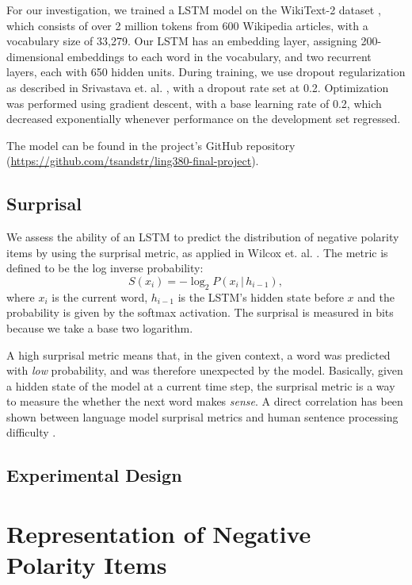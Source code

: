 \documentclass[11pt, round]{article}
\begin{document}
For our investigation, we trained a LSTM model on the WikiText-2 dataset \cite{merity2016pointer}, which consists of over 2 million tokens from 600 Wikipedia articles, with a vocabulary size of 33,279. Our LSTM has an embedding layer, assigning 200-dimensional embeddings to each word in the vocabulary, and two recurrent layers, each with 650 hidden units. During training, we use dropout regularization as described in Srivastava et. al. , with a dropout rate set at 0.2. Optimization was performed using gradient descent, with a base learning rate of 0.2, which decreased exponentially whenever performance on the development set regressed.

The model can be found in the project's GitHub repository (\url{https://github.com/tsandstr/ling380-final-project}).

\subsection{Surprisal}

We assess the ability of an LSTM to predict the distribution of negative polarity items by using the surprisal metric, as applied in Wilcox et. al. . The metric is defined to be the log inverse probability:
\[ S(x_i) = -\log_2 P(x_i \, | \, h_{i-1}), \]
where $x_i$ is the current word, $h_{i-1}$ is the LSTM's hidden state before $x$ and the probability is given by the softmax activation. The surprisal is measured in bits because we take a base two logarithm.

A high surprisal metric means that, in the given context, a word was predicted with \textit{low} probability, and was therefore unexpected by the model. Basically, given a hidden state of the model at a current time step, the surprisal metric is a way to measure the whether the next word makes \textit{sense}. A direct correlation has been shown between language model surprisal metrics and  human sentence processing difficulty \cite{hale2001probabilistic,levy2008expectation,smith2013effect}. 

\subsection{Experimental Design}

\section{Representation of Negative Polarity Items}
\end{document}
